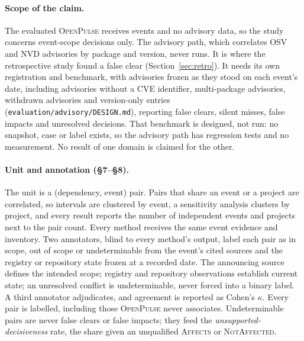 \documentclass[11pt,a4paper]{article}
\newcommand{\op}{\textsc{OpenPulse}}
\newcommand{\code}[1]{\texttt{#1}}
\begin{document}
\paragraph{Scope of the claim.} The evaluated \op{} receives events and
no advisory data, so the study concerns event-scope decisions only. The
advisory path, which correlates OSV and NVD advisories by package and
version, never runs. It is where the retrospective study found a false
clear (Section~\ref{sec:retro}). It needs its own registration and
benchmark, with advisories frozen as they stood on each event's date,
including advisories without a CVE identifier, multi-package
advisories, withdrawn advisories and version-only entries
(\code{evaluation/advisory/DESIGN.md}), reporting false clears, silent
misses, false impacts and unresolved decisions. That benchmark is
designed, not run: no snapshot, case or label exists, so the advisory
path has regression tests and no measurement. No result of one domain
is claimed for the other.

\paragraph{Unit and annotation (\S7--\S8).} The unit is a (dependency,
event) pair. Pairs that share an event or a project are correlated, so
intervals are clustered by event, a sensitivity analysis clusters by
project, and every result reports the number of independent events and
projects next to the pair count. Every method receives the same event
evidence and inventory. Two annotators, blind to every method's output,
label each pair as in scope, out of scope or undeterminable from the
event's cited sources and the registry or repository state frozen at a
recorded date. The announcing source defines the intended scope;
registry and repository observations establish current state; an
unresolved conflict is undeterminable, never forced into a binary
label. A third annotator adjudicates, and agreement is reported as
Cohen's $\kappa$. Every pair is labelled, including those \op{} never
associates. Undeterminable pairs are never false clears or false
impacts; they feed the \emph{unsupported-decisiveness} rate, the share
given an unqualified \textsc{Affects} or \textsc{NotAffected}.
\end{document}

